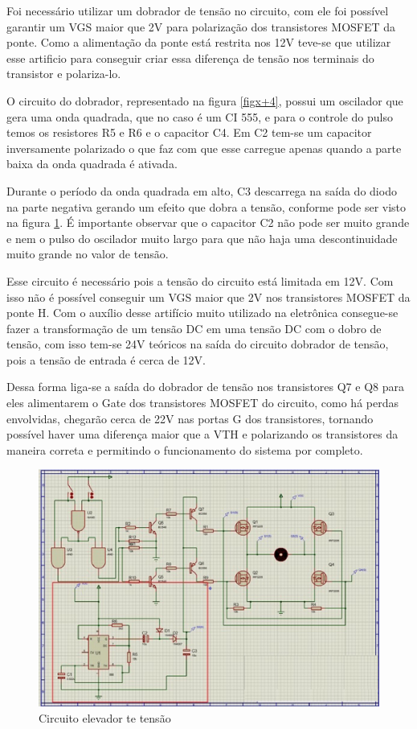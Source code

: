 Foi necessário utilizar um dobrador de tensão no circuito, com ele foi possível garantir um VGS maior que 2V para polarização dos transistores MOSFET da ponte. Como a alimentação da ponte está restrita nos 12V teve-se que utilizar esse artificio para conseguir criar essa diferença de tensão nos terminais do transistor e polariza-lo.

O circuito do dobrador, representado na figura \ref{figx+4}, possui um oscilador que gera uma onda quadrada, que no caso é um CI 555, e para o controle do pulso temos os resistores R5 e R6 e o capacitor C4. Em C2 tem-se um capacitor inversamente polarizado o que faz com que esse carregue apenas quando a parte baixa da onda quadrada é ativada.

Durante o período da onda quadrada em alto, C3 descarrega na saída do diodo na parte negativa gerando um efeito que dobra a tensão, conforme pode ser visto na figura \ref{fig:figx+4}. É importante observar que o capacitor C2 não pode ser muito grande e nem o pulso do oscilador muito largo para que não haja uma descontinuidade muito grande no valor de tensão.

Esse circuito é necessário pois a tensão do circuito está limitada em 12V. Com isso não é possível conseguir um VGS maior que 2V nos transistores MOSFET da ponte H. Com o auxílio desse artifício muito utilizado na eletrônica consegue-se fazer a transformação de um tensão DC em uma tensão DC com o dobro de tensão, com isso tem-se 24V teóricos na saída do circuito dobrador de tensão, pois a tensão de entrada é cerca de 12V.

Dessa forma liga-se a saída do dobrador de tensão nos transistores Q7 e Q8 para eles alimentarem o Gate dos transistores MOSFET do circuito, como há perdas envolvidas, chegarão cerca de 22V nas portas G dos transistores, tornando possível haver uma diferença maior que a VTH e polarizando os transistores da maneira correta e permitindo o funcionamento do sistema por completo.

\begin{figure}[!htb]
	\centering
	\includegraphics[keepaspectratio=true,scale=0.8]{figuras/referencialteorico/figurax_4.eps}
	\caption{Circuito elevador te tensão}
	\label{fig:figx+4}
\end{figure}


